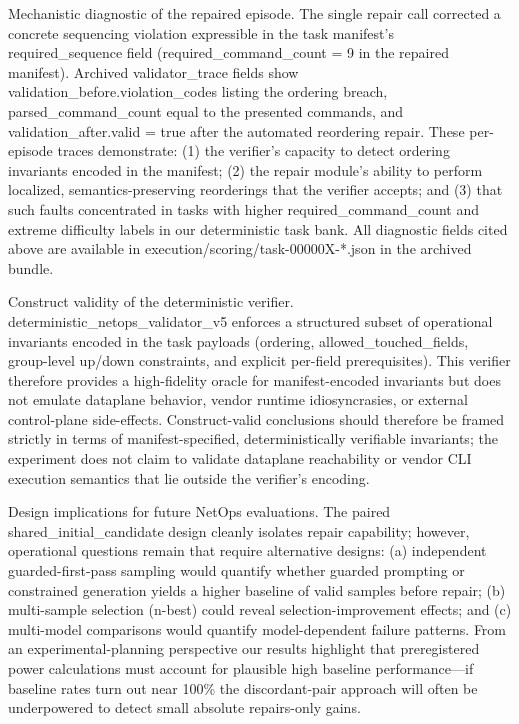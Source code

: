 \documentclass[conference]{IEEEtran}
\begin{document}
Mechanistic diagnostic of the repaired episode. The single repair call corrected a concrete sequencing violation expressible in the task manifest's required\_sequence field (required\_command\_count = 9 in the repaired manifest). Archived validator\_trace fields show validation\_before.violation\_codes listing the ordering breach, parsed\_command\_count equal to the presented commands, and validation\_after.valid = true after the automated reordering repair. These per-episode traces demonstrate: (1) the verifier's capacity to detect ordering invariants encoded in the manifest; (2) the repair module's ability to perform localized, semantics-preserving reorderings that the verifier accepts; and (3) that such faults concentrated in tasks with higher required\_command\_count and extreme difficulty labels in our deterministic task bank. All diagnostic fields cited above are available in execution/scoring/task-00000X-*.json in the archived bundle.

Construct validity of the deterministic verifier. deterministic\_netops\_validator\_v5 enforces a structured subset of operational invariants encoded in the task payloads (ordering, allowed\_touched\_fields, group-level up/down constraints, and explicit per-field prerequisites). This verifier therefore provides a high-fidelity oracle for manifest-encoded invariants but does not emulate dataplane behavior, vendor runtime idiosyncrasies, or external control-plane side-effects. Construct-valid conclusions should therefore be framed strictly in terms of manifest-specified, deterministically verifiable invariants; the experiment does not claim to validate dataplane reachability or vendor CLI execution semantics that lie outside the verifier's encoding.

Design implications for future NetOps evaluations. The paired shared\_initial\_candidate design cleanly isolates repair capability; however, operational questions remain that require alternative designs: (a) independent guarded-first-pass sampling would quantify whether guarded prompting or constrained generation yields a higher baseline of valid samples before repair; (b) multi-sample selection (n-best) could reveal selection-improvement effects; and (c) multi-model comparisons would quantify model-dependent failure patterns. From an experimental-planning perspective our results highlight that preregistered power calculations must account for plausible high baseline performance---if baseline rates turn out near 100\% the discordant-pair approach will often be underpowered to detect small absolute repairs-only gains.
\end{document}
